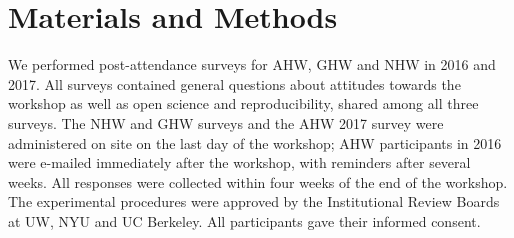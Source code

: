 \documentclass{aastex62}
\begin{document}

\newpage

\tableofcontents



\section{Materials and Methods}
\label{sec:suppmaterials}
We performed post-attendance surveys for AHW, GHW and NHW in 2016 and 2017. All surveys contained general questions about attitudes towards the workshop as well as open science and reproducibility, shared among all three surveys. The NHW and GHW surveys and the AHW 2017 survey were administered on site on the last day of the workshop; AHW participants in 2016 were e-mailed immediately after the workshop, with reminders after several weeks. All responses were collected within four weeks of the end of the workshop. The experimental procedures were approved by the Institutional Review Boards at UW, NYU and UC Berkeley. All participants gave their informed consent.
\end{document}
